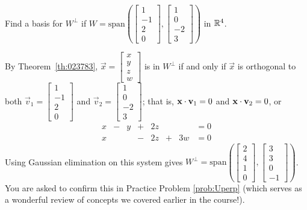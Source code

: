 \documentclass{ximera}
\begin{document}
\begin{example}\label{ex:023829}
Find a basis for $W^\perp$ if $W = \mbox{span}\left(\begin{bmatrix}
  1 \\ -1 \\ 2 \\ 0
  \end{bmatrix},
  \begin{bmatrix}
  1 \\ 0 \\ -2 \\ 3
  \end{bmatrix}\right)$ in $\mathbb{R}^4$.

\begin{explanation}
  By Theorem~\ref{th:023783}, $\vec{x} = \begin{bmatrix}
  x \\ y \\ z \\ w
  \end{bmatrix}$
  is in $W^\perp$ if and only if $\vec{x}$ is orthogonal to both 
  $\vec{v}_1 = \begin{bmatrix}
  1 \\ -1 \\ 2 \\ 0
  \end{bmatrix}$ and
  $\vec{v}_2 = \begin{bmatrix}
  1 \\ 0 \\ -2 \\ 3
  \end{bmatrix}$; that is,
  $\mathbf{x} \cdot \mathbf{v}_1 = 0$ and $\mathbf{x} \cdot \mathbf{v}_2 = 0$, or
\begin{equation*}
\begin{array}{rrrrrrrr}
x & - & y & + & 2z & & & =0\\
x & & & - & 2z & +& 3w & =0
\end{array}
\end{equation*}
Using Gaussian elimination on this system gives $W^\perp = \mbox{span}\left(\begin{bmatrix}
  2 \\ 4 \\ 1 \\ 0
  \end{bmatrix},
  \begin{bmatrix}
  3 \\ 3 \\ 0 \\ -1
  \end{bmatrix}\right)$.  You are asked to confirm this in Practice Problem \ref{prob:Uperp} (which serves as a wonderful review of concepts we covered earlier in the course!).  
\end{explanation}
\end{example}
\end{document}

